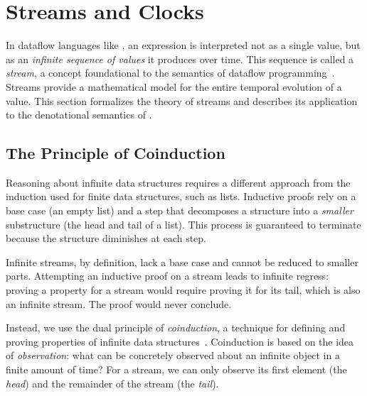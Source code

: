 \section{Streams and Clocks}
\label{sec:semantics:streams}

In dataflow languages like \GRust, an expression is interpreted not as a single value, but as an
\emph{infinite sequence of values} it produces over time. This sequence is called a \emph{stream}, a
concept foundational to the semantics of dataflow programming~\cite{%
    DBLP:conf/ifip/Kahn74,%
    DBLP:journals/tecs/BourkePP23,%
    DBLP:journals/tcad/LeeS98%
}. Streams provide a mathematical model for the entire temporal evolution of a value.
%
This section formalizes the theory of streams and describes its application to the denotational
semantics of \GRust.

\subsection{The Principle of Coinduction}
\label{sec:semantics:streams:coinduction}

Reasoning about infinite data structures requires a different approach from the induction used for
finite data structures, such as lists. Inductive proofs rely on a base case (\eg an empty list) and
a step that decomposes a structure into a \emph{smaller} substructure (\eg the head and tail of a
list). This process is guaranteed to terminate because the structure diminishes at each step.

Infinite streams, by definition, lack a base case and cannot be reduced to smaller parts. Attempting
an inductive proof on a stream leads to infinite regress: proving a property for a stream would
require proving it for its tail, which is also an infinite stream. The proof would never conclude.

Instead, we use the dual principle of \emph{coinduction}, a technique for defining and proving
properties of infinite data structures~\cite{DBLP:journals/mscs/KozenS17}. Coinduction is based on
the idea of \emph{observation}: what can be concretely observed about an infinite object in a finite
amount of time? For a stream, we can only observe its first element (the \emph{head}) and the
remainder of the stream (the \emph{tail}).

